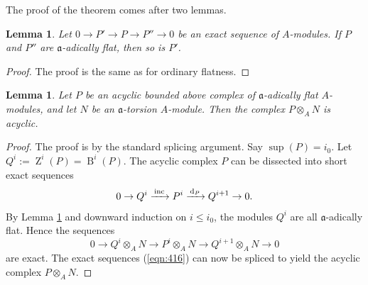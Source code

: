 \documentclass[10pt]{amsart}
\newtheorem{lem}[equation]{Lemma}
\theoremstyle{definition}
\numberwithin{equation}{section}
\newcommand{\xar}{\xrightarrow}
\newcommand{\opn}{\operatorname}
\newcommand{\mfrak}[1]{\mathfrak{#1}}
\newcommand{\mrm}[1]{\mathrm{#1}}
\renewcommand{\a}{\mfrak{a}}
\newcommand{\ot}{\otimes}
\renewcommand{\d}{\mathrm{d}}
\newcommand{\msp}[1]{\mspace{#1 mu}}
\begin{document}
The proof of the theorem comes after two lemmas.

\begin{lem} \label{lem:415}
Let $0 \to P' \to P \to P'' \to 0$
be an exact sequence of $A$-modules. If $P$ and $P''$ are $\a$-adically flat,
then so is $P'$.
\end{lem}

\begin{proof}
The proof is the same as for ordinary flatness.
\end{proof}

\begin{lem} \label{lem:416}
Let $P$ be an acyclic bounded above complex of $\a$-adically flat $A$-modules,
and let $N$ be an $\a$-torsion $A$-module.
Then the complex $P \ot_A N$ is acyclic.
\end{lem}

\begin{proof}
The proof is by the standard splicing argument.
Say $\opn{sup}(P) = i_0$.
Let $Q^i := \opn{Z}^i(P) = \opn{B}^i(P)$. The acyclic complex $P$
can be dissected into short exact sequences
\begin{equation} \label{eqn:415}
0 \to Q^i \xar{\msp{3} \mrm{inc} \msp{3}} P^i
\xar{\msp{3} \d_P \msp{3}} Q^{i + 1} \to  0 .
\end{equation}
By Lemma \ref{lem:415} and downward induction on $i \leq i_0$, the modules
$Q^i$ are all $\a$-adically flat. Hence the sequences
\begin{equation} \label{eqn:416}
0 \to Q^i \ot_A N \xar{} P^i  \ot_A N \xar{} Q^{i + 1}  \ot_A N \to  0
\end{equation}
are exact.
The exact sequences (\ref{eqn:416}) can now be spliced to yield the acyclic
complex $P \ot_A N$.
\end{proof}
\end{document}
